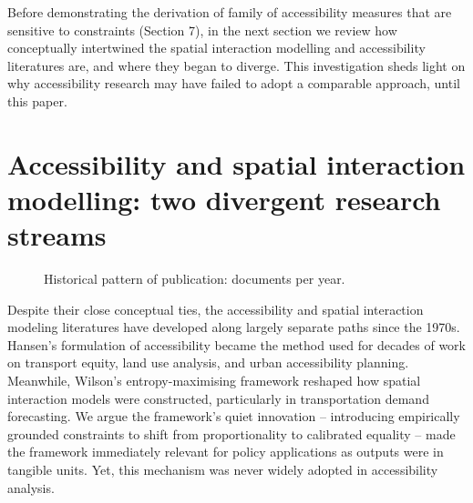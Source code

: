 \documentclass[
  10pt,
  letterpaper,
]{article}
\begin{document}
Before demonstrating the derivation of family of accessibility measures
that are sensitive to constraints (Section 7), in the next section we
review how conceptually intertwined the spatial interaction modelling
and accessibility literatures are, and where they began to diverge. This
investigation sheds light on why accessibility research may have failed
to adopt a comparable approach, until this paper.

\section{Accessibility and spatial interaction modelling: two divergent
research
streams}\label{accessibility-and-spatial-interaction-modelling-two-divergent-research-streams}

\begin{figure}[H]


\caption{\label{fig-docs-per-year}Historical pattern of publication:
documents per year.}

\end{figure}%

Despite their close conceptual ties, the accessibility and spatial
interaction modeling literatures have developed along largely separate
paths since the 1970s. Hansen's \citep{hansen1959} formulation of
accessibility became the method used for decades of work on transport
equity, land use analysis, and urban accessibility planning. Meanwhile,
Wilson's \citep{wilson1971} entropy-maximising framework reshaped how
spatial interaction models were constructed, particularly in
transportation demand forecasting. We argue the framework's quiet
innovation -- introducing empirically grounded constraints to shift from
proportionality to calibrated equality -- made the framework immediately
relevant for policy applications as outputs were in tangible units. Yet,
this mechanism was never widely adopted in accessibility analysis.
\end{document}
